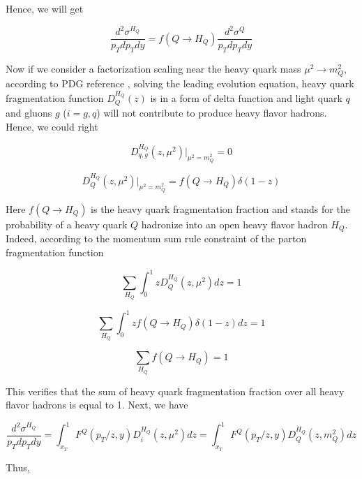 Hence, we will get 

\begin{equation}
\frac{d^2\sigma^{H_Q}}{p_T dp_T dy} = f(Q \rightarrow H_Q)  \frac{d^2\sigma^Q}{p_T dp_T dy}
\end{equation}

\fi

Now if we consider a factorization scaling near the heavy quark mass $\mu^2 \rightarrow m_Q^2$, according to PDG reference \cite{AlphaTheoEx}, solving the leading evolution equation, heavy quark fragmentation function $D_Q^{H_Q}(z)$ is in a form of delta function and light quark $q$ and gluons $g$ ($i = g, q$) will not contribute to produce heavy flavor hadrons. Hence, we could right

\begin{equation}
D^{H_Q}_{q,g}(z,\mu^2)|_{\mu^2=m_Q^2} = 0
\end{equation}

\begin{equation}
D^{H_Q}_{Q}(z,\mu^2)|_{\mu^2=m_Q^2} = f(Q \rightarrow H_Q) \delta(1 - z)
\end{equation}

Here $f({Q \rightarrow H_Q})$ is the heavy quark fragmentation fraction and stands for the probability of a heavy quark $Q$ hadronize into an open heavy flavor hadron $H_Q$. Indeed, according to the momentum sum rule constraint of the parton fragmentation function \cite{QCDFFunc}

\begin{equation}
\sum_{H_Q} \int_0^1 z D^{H_Q}_{Q}(z,\mu^2) dz = 1
\end{equation}

\begin{equation}
\sum_{H_Q} \int_0^1 z f(Q \rightarrow H_Q) \delta(1 - z) dz = 1
\end{equation}

\begin{equation}
\sum_{H_Q} f(Q \rightarrow H_Q) = 1 
\end{equation}

This verifies that the sum of heavy quark fragmentation fraction over all heavy flavor hadrons is equal to 1. Next, we have 


\begin{equation}
\frac{d^2\sigma^{H_Q}}{p_T dp_T dy} = \int_{x_T}^1 F^Q(p_T/z, y) D_{i}^{H_Q}(z,\mu^2) dz =  \int_{x_T}^1 F^Q(p_T/z, y) D^{H_Q}_{Q}(z,m_Q^2) dz 
\end{equation}

Thus,

